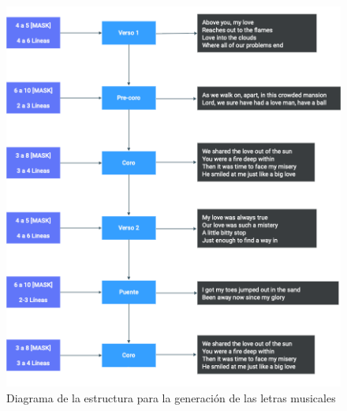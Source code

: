\documentclass[12pt, a4paper, titlepage]{report}
\begin{document}
			\begin{figure}[H] 
				\includegraphics[scale=.45]{./imagenes/Disenio/Arquitectura/Generacion_letras.png}
				\centering 
				\caption{Diagrama de la estructura para la generación de las letras musicales}
			\end{figure}
		
		\newpage
		
\end{document}
